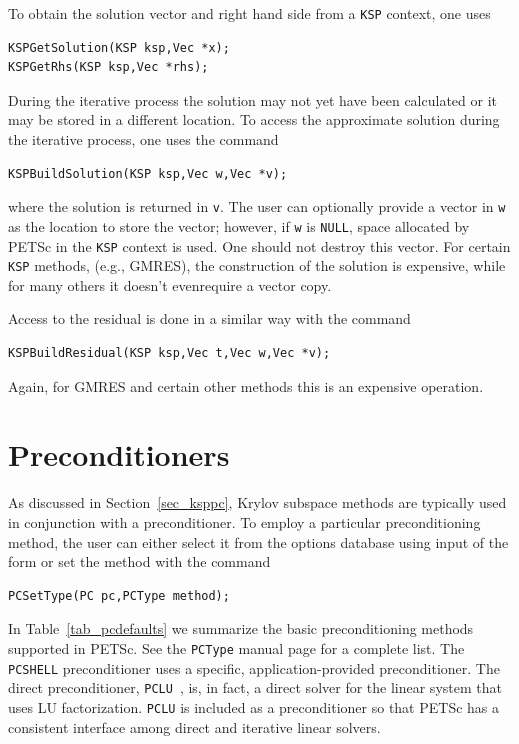 To obtain the solution vector and right hand side from a \lstinline{KSP}
context, one uses
\begin{lstlisting}
KSPGetSolution(KSP ksp,Vec *x);
KSPGetRhs(KSP ksp,Vec *rhs);
\end{lstlisting}
During the iterative process
the solution may not yet have been calculated or it may be stored in
a different location. To access the approximate solution during the
iterative process, one uses the command
\begin{lstlisting}
KSPBuildSolution(KSP ksp,Vec w,Vec *v);
\end{lstlisting}
where the solution is returned in \lstinline{v}. The user can optionally provide
a vector in \lstinline{w} as the location to store the vector; however, if
\lstinline{w} is \lstinline{NULL}, space allocated by PETSc in the \lstinline{KSP} context is
used. One should not destroy this vector. For certain \lstinline{KSP} methods,
(e.g., GMRES), the construction of the solution is expensive, while for many
others it doesn't evenrequire a vector copy.

Access to the residual is done in a similar way with the
command
\begin{lstlisting}
KSPBuildResidual(KSP ksp,Vec t,Vec w,Vec *v);
\end{lstlisting}
Again, for GMRES and certain other methods this is an expensive
operation.

\section{Preconditioners} 
\label{sec_pc}

As discussed in Section~\ref{sec_ksppc}, Krylov subspace methods are
typically used in conjunction with a preconditioner.
To employ a particular preconditioning method, the user can either select
it from the options database using input of the form
 or set the method with the
command 
\begin{lstlisting}
PCSetType(PC pc,PCType method);
\end{lstlisting}
In Table~\ref{tab_pcdefaults} we summarize the basic
preconditioning methods supported in PETSc. See the \lstinline{PCType} manual page for a complete list. 
The \lstinline{PCSHELL} preconditioner uses a specific,
application-provided preconditioner.  The direct preconditioner, \lstinline{PCLU}~,
is, in fact, a direct solver for the linear system that uses LU
factorization. \lstinline{PCLU} is included as a preconditioner so that PETSc has a
consistent interface among direct and iterative linear solvers.

